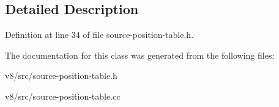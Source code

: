 \subsection{Detailed Description}


Definition at line 34 of file source-\/position-\/table.\+h.



The documentation for this class was generated from the following files\+:\begin{DoxyCompactItemize}
\item 
v8/src/source-\/position-\/table.\+h\item 
v8/src/source-\/position-\/table.\+cc\end{DoxyCompactItemize}
